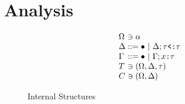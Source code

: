 \documentclass[acmsmall]{acmart}
\begin{document}
\section{Analysis}



\begin{figure*}[h]
\[
\begin{array}{l @{} l}
  \Omega 
  &{} \owns \alpha 
  \\
  \Delta 
  &{} ::=
  \begin{array}[t]{@{} l}
    \bullet 
    \ |\ 
    \Delta; \code{$\tau$<:$\tau$}
  \end{array}
  \\
  \Gamma 
  &{} ::=
  \begin{array}[t]{@{} l}
    \bullet 
    \ |\ 
    \Gamma; \code{$x$:$\tau$}
  \end{array}
  \\
  T 
  &{} \owns (\Omega, \Delta, \tau)
  \\
  C 
  &{} \owns (\Omega, \Delta)
  \\
\end{array}
\]

\caption{Internal Structures}
\end{figure*}


\end{document}
